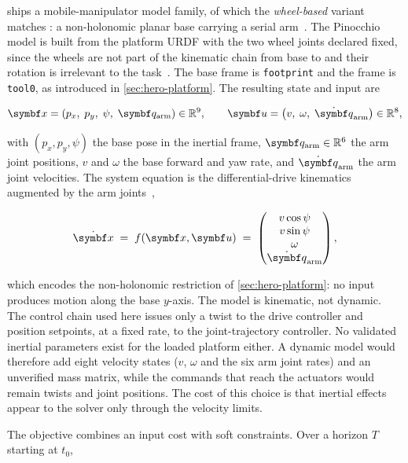 \ocs{} ships a mobile-manipulator model family, of which the
\emph{wheel-based} variant matches \hero{}: a non-holonomic planar base
carrying a serial arm~\cite{ocs2Toolbox}. The Pinocchio model is built
from the platform URDF with the two wheel joints declared fixed, since
the wheels are not part of the kinematic chain from base to \ee{} and
their rotation is irrelevant to the
task~\cite{Carpentier2019Pinocchio}. The base frame is \texttt{footprint}
and the \ee{} frame is \texttt{tool0}, as introduced in
\cref{sec:hero-platform}. The resulting state and input are

\begin{equation}
  \svec = \left( p_x,\; p_y,\; \psi,\; \qarm \right) \in \mathbb{R}^{9},
  \qquad
  \uvec = \left( v,\; \omega,\; \qarmdot \right) \in \mathbb{R}^{8},
  \label{eq:state-input}
\end{equation}

with $(p_x, p_y, \psi)$ the base pose in the inertial frame,
$\qarm \in \mathbb{R}^{6}$ the arm joint positions, $v$ and $\omega$ the
base forward and yaw rate, and $\qarmdot$ the arm joint velocities.
The system equation is the differential-drive kinematics augmented by
the arm joints~\cite{Lynch2017ModernRobotics},

\begin{equation}
  \dot{\svec} \;=\; f(\svec, \uvec) \;=\;
  \begin{pmatrix}
    v \cos\psi \\ v \sin\psi \\ \omega \\ \qarmdot
  \end{pmatrix} ,
  \label{eq:flowmap}
\end{equation}

which encodes the non-holonomic restriction of
\cref{sec:hero-platform}: no input produces motion along the base
$y$-axis. The model is kinematic, not dynamic. The control chain used
here issues only a twist to the drive controller and position setpoints,
at a fixed rate, to the joint-trajectory controller. No validated
inertial parameters exist for the loaded platform either. A dynamic
model would therefore add eight velocity states ($v$, $\omega$ and the
six arm joint rates) and an unverified mass matrix, while the commands
that reach the actuators would remain twists and joint positions. The
cost of this choice is that inertial effects appear to the solver only
through the velocity limits.

The objective combines an input cost with soft constraints. Over a
horizon $T$ starting at $t_0$,

